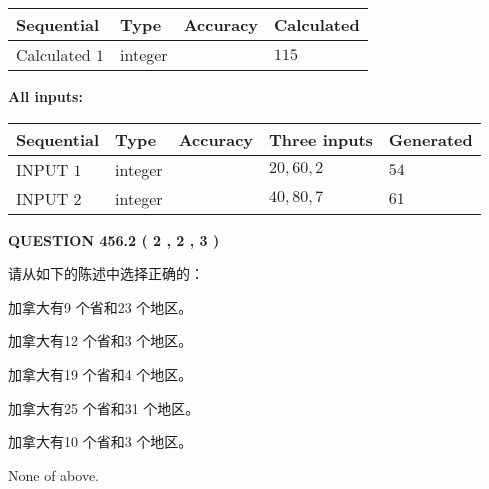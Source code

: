 \documentclass{ctexart}
\begin{document}
   
   
   
\noindent{}
   
   
  
  
\noindent\begin{tabular}{|l|l|l|l|}
\hline
 Sequential & Type & Accuracy & Calculated \\ 
\hline
 
 
  Calculated $  1 $ & integer &  & 
  $ 115 $ 
 \\  \hline  
 \end{tabular}
   
   
   
   
\noindent\vspace{0.1in}\hspace{-0.08in} {\textbf{\Large{All inputs: }}}
   
   
  
  
\noindent\begin{tabular}{|l|l|l|l|l|}
\hline
 Sequential & Type & Accuracy & Three inputs & Generated \\ 
\hline
 
 
  INPUT $  1 $ & integer &  & $
 20
 , 
 60
 , 
 2
 $ & $ 54 $ 
 \\  \hline  
 
 
  INPUT $  2 $ & integer &  & $
 40
 , 
 80
 , 
 7
 $ & $ 61 $ 
 \\  \hline  
 \end{tabular}
   
   
  
\vspace{0.2in}
  
{\textbf{\Large{QUESTION
456.2 
 ( 2 , 2 , 3 )
}}}
  
  
请从如下的陈述中选择正确的：
 
 
加拿大有9 个省和23 个地区。
 
 
加拿大有12 个省和3 个地区。
 
 
加拿大有19 个省和4 个地区。
 
 
加拿大有25 个省和31 个地区。
 
 
加拿大有10 个省和3 个地区。
 
 
 None of above.
 
 
\noindent{}
 
\end{document}
